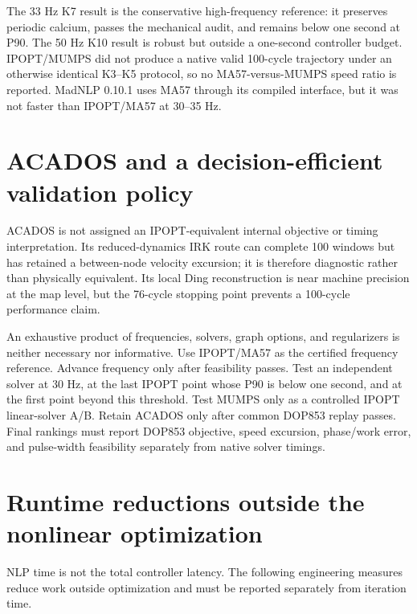 \documentclass[10pt]{article}
\begin{document}
The 33 Hz K7 result is the conservative high-frequency reference: it preserves periodic calcium, passes the mechanical audit, and remains below one second at P90. The 50 Hz K10 result is robust but outside a one-second controller budget. IPOPT/MUMPS did not produce a native valid 100-cycle trajectory under an otherwise identical K3--K5 protocol, so no MA57-versus-MUMPS speed ratio is reported. MadNLP 0.10.1 uses MA57 through its compiled interface, but it was not faster than IPOPT/MA57 at 30--35 Hz.

\section{ACADOS and a decision-efficient validation policy}

ACADOS is not assigned an IPOPT-equivalent internal objective or timing interpretation. Its reduced-dynamics IRK route can complete 100 windows but has retained a between-node velocity excursion; it is therefore diagnostic rather than physically equivalent. Its local Ding reconstruction is near machine precision at the map level, but the 76-cycle stopping point prevents a 100-cycle performance claim.

An exhaustive product of frequencies, solvers, graph options, and regularizers is neither necessary nor informative. Use IPOPT/MA57 as the certified frequency reference. Advance frequency only after feasibility passes. Test an independent solver at 30 Hz, at the last IPOPT point whose P90 is below one second, and at the first point beyond this threshold. Test MUMPS only as a controlled IPOPT linear-solver A/B. Retain ACADOS only after common DOP853 replay passes. Final rankings must report DOP853 objective, speed excursion, phase/work error, and pulse-width feasibility separately from native solver timings.

\section{Runtime reductions outside the nonlinear optimization}

NLP time is not the total controller latency. The following engineering measures reduce work outside optimization and must be reported separately from iteration time.
\end{document}
